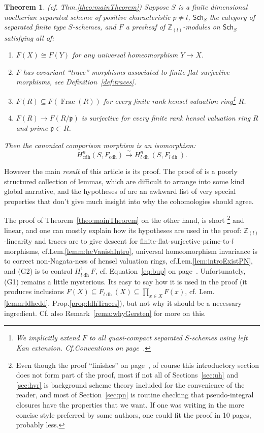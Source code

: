 \documentclass[10pt]{amsart}
\newtheorem{theo}{Theorem}
\theoremstyle{definition}
\newcommand{\p}{\mathfrak{p}}
\newcommand{\ZZ}{\mathbb{Z}}
\newcommand{\zll}{\mathbb{Z}_{(l)}}
\DeclareMathOperator{\Frac}{Frac}
\newcommand{\Sch}{\mathsf{Sch}}
\newcommand{\ulh}{\underline{H}}
\newcommand{\Zll}{\ZZ_{(l)}}
\newcommand{\cdh}{{{\operatorname{cdh}}}}
\newcommand{\ldh}{{l{\operatorname{dh}}}}
\newcommand{\uh}{\operatorname{uh}}
\begin{document}
\begin{theo} {(cf{.} Thm.\ref{theo:mainTheorem})}
Suppose $S$ is a finite dimensional noetherian separated scheme of positive characteristic $p \neq l$, $\Sch_S$ the category of separated finite type $S$-schemes, and $F$ a presheaf of $\Zll$-modules on $\Sch_S$ satisfying \emph{all} of:
\begin{enumerate}
 \item[($\uh$-invariance)] $F(X) \cong F(Y)$ for any universal homeomorphism $Y \to X$. 

 \item[(Traces)] $F$ has covariant ``trace'' morphisms associated to finite flat surjective morphisms, see Definition~\ref{def:traces}.

 \item[(G1)] $F(R) \subseteq F(\Frac(R))$ for every finite rank hensel valuation ring\footnote{We implicitly extend $F$ to all quasi-compact separated $S$-schemes using left Kan extension. Cf.Conventions on page~\pageref{convention}.} $R$.

 \item[(G2)] $F(R) \to F(R/\p)$ is surjective for every finite rank hensel valuation ring $R$ and prime $\p \subset R$. 
\end{enumerate}
Then the canonical comparison morphism is an isomorphism:
\[ H_\cdh^n(S, F_\cdh) \stackrel{\sim}{\to} H_\ldh^n(S, F_\ldh). \]
\end{theo}

However the main \emph{result} of this article is its proof. The proof of \cite[Cor.2.5.4]{Kel17} is a poorly structured collection of lemmas, which are difficult to arrange into some kind global narrative, and the hypotheses of \cite[Cor.2.5.4]{Kel17} are an awkward list of very special properties that don’t give much insight into why the cohomologies should agree.

The proof of Theorem~\ref{theo:mainTheorem} on the other hand, is short%
\footnote{Even though the proof ``finishes'' on page~\pageref{sec:cdhldh}, of course this introductory section does not form part of the proof, most if not all of Sections~\ref{sec:uh} and \ref{sec:hvr} is background scheme theory included for the convenience of the reader, and most of Section~\ref{sec:pn} is routine checking that pseudo-integral closures have the properties that we want. If one was writing in the more concise style preferred by some authors, one could fit the proof in 10 pages, probably less.} %
 and linear, and one can mostly explain how its hypotheses are used in the proof: $\zll$-linearity and traces are to give descent for \mbox{finite-flat-surjective-prime-to-$l$} morphisms, cf.Lem.\ref{lemm:hcVanishIntro}, universal homeomorphism invariance is to correct non-Nagata-ness of hensel valuation rings, cf.Lem.\ref{lem:introExistPN}, and (G2) is to control $\ulh^1_\ldh F$, cf. Equation~\ref{eq:bup} on page~\pageref{eq:bup}. Unfortunately, (G1) remains a little mysterious. Its easy to say how it is used in the proof (it produces inclusions $F(X) \subseteq F_\ldh(X) \subseteq \prod_{x \in X} F(x)$, cf. Lem.\ref{lemm:ldhcdd}, Prop.\ref{prop:ldhTraces}), but not why it should be a necessary ingredient. Cf. also Remark~\ref{rema:whyGersten} for more on this.
 
\end{document}
